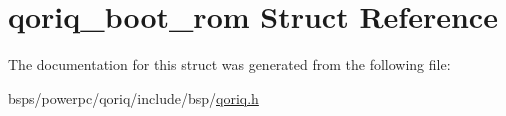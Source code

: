 \hypertarget{structqoriq__boot__rom}{}\section{qoriq\+\_\+boot\+\_\+rom Struct Reference}
\label{structqoriq__boot__rom}


The documentation for this struct was generated from the following file\+:\begin{DoxyCompactItemize}
\item 
bsps/powerpc/qoriq/include/bsp/\mbox{\hyperlink{qoriq_8h}{qoriq.\+h}}\end{DoxyCompactItemize}
